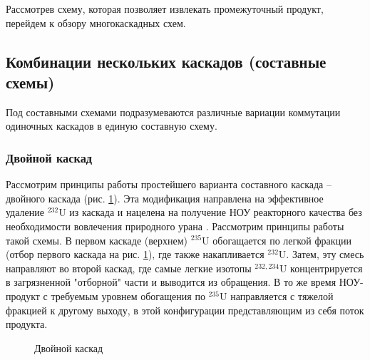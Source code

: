 Рассмотрев схему, которая позволяет извлекать промежуточный продукт, перейдем к обзору многокаскадных схем.


\subsection{Комбинации нескольких каскадов (составные схемы)}\label{sec:ch1/sec2.3}
Под составными схемами подразумеваются различные вариации коммутации одиночных каскадов в единую составную схему.

\subsubsection{Двойной каскад}

Рассмотрим принципы работы простейшего варианта составного каскада -- двойного каскада (рис. \ref{fig:double_ru}).
Эта модификация направлена на эффективное удаление $^{232}$U из каскада и нацелена на получение НОУ реакторного качества без необходимости вовлечения природного урана \cite{SosninYuChelcov, TehnicheskieResheniyaPo}.
Рассмотрим принципы работы такой схемы.
В первом каскаде (верхнем) $^{235}$U обогащается по легкой фракции (отбор первого каскада на рис. \ref{fig:double_ru}), где также накапливается $^{232}$U.
Затем, эту смесь направляют во второй каскад, где самые легкие изотопы $^{232,234}$U концентрируется в загрязненной "отборной" части и выводится из обращения.
В то же время НОУ-продукт с требуемым уровнем обогащения по $^{235}$U направляется с тяжелой фракцией к другому выходу, в этой конфигурации представляющим из себя поток продукта.
\begin{figure}[ht]
  \caption{Двойной каскад}\label{fig:double_ru}
\end{figure}


